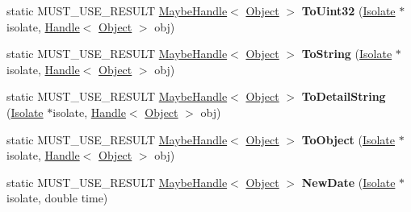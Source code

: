 \begin{DoxyCompactItemize}
\item 
\hypertarget{classv8_1_1internal_1_1_v8___f_i_n_a_l_af66ddd64eed4526cf7ae9a31807fa8ab}{}static M\+U\+S\+T\+\_\+\+U\+S\+E\+\_\+\+R\+E\+S\+U\+L\+T \hyperlink{classv8_1_1internal_1_1_maybe_handle}{Maybe\+Handle}$<$ \hyperlink{classv8_1_1internal_1_1_object}{Object} $>$ {\bfseries To\+Uint32} (\hyperlink{classv8_1_1internal_1_1_isolate}{Isolate} $\ast$isolate, \hyperlink{classv8_1_1internal_1_1_handle}{Handle}$<$ \hyperlink{classv8_1_1internal_1_1_object}{Object} $>$ obj)\label{classv8_1_1internal_1_1_v8___f_i_n_a_l_af66ddd64eed4526cf7ae9a31807fa8ab}

\item 
\hypertarget{classv8_1_1internal_1_1_v8___f_i_n_a_l_a0b9f324870c79d961237e2b643e220cc}{}static M\+U\+S\+T\+\_\+\+U\+S\+E\+\_\+\+R\+E\+S\+U\+L\+T \hyperlink{classv8_1_1internal_1_1_maybe_handle}{Maybe\+Handle}$<$ \hyperlink{classv8_1_1internal_1_1_object}{Object} $>$ {\bfseries To\+String} (\hyperlink{classv8_1_1internal_1_1_isolate}{Isolate} $\ast$isolate, \hyperlink{classv8_1_1internal_1_1_handle}{Handle}$<$ \hyperlink{classv8_1_1internal_1_1_object}{Object} $>$ obj)\label{classv8_1_1internal_1_1_v8___f_i_n_a_l_a0b9f324870c79d961237e2b643e220cc}

\item 
\hypertarget{classv8_1_1internal_1_1_v8___f_i_n_a_l_a3c789336bcb47c86cef42888e6d2f934}{}static M\+U\+S\+T\+\_\+\+U\+S\+E\+\_\+\+R\+E\+S\+U\+L\+T \hyperlink{classv8_1_1internal_1_1_maybe_handle}{Maybe\+Handle}$<$ \hyperlink{classv8_1_1internal_1_1_object}{Object} $>$ {\bfseries To\+Detail\+String} (\hyperlink{classv8_1_1internal_1_1_isolate}{Isolate} $\ast$isolate, \hyperlink{classv8_1_1internal_1_1_handle}{Handle}$<$ \hyperlink{classv8_1_1internal_1_1_object}{Object} $>$ obj)\label{classv8_1_1internal_1_1_v8___f_i_n_a_l_a3c789336bcb47c86cef42888e6d2f934}

\item 
\hypertarget{classv8_1_1internal_1_1_v8___f_i_n_a_l_a9596bc40e2fe635b7e53366e9b0d7094}{}static M\+U\+S\+T\+\_\+\+U\+S\+E\+\_\+\+R\+E\+S\+U\+L\+T \hyperlink{classv8_1_1internal_1_1_maybe_handle}{Maybe\+Handle}$<$ \hyperlink{classv8_1_1internal_1_1_object}{Object} $>$ {\bfseries To\+Object} (\hyperlink{classv8_1_1internal_1_1_isolate}{Isolate} $\ast$isolate, \hyperlink{classv8_1_1internal_1_1_handle}{Handle}$<$ \hyperlink{classv8_1_1internal_1_1_object}{Object} $>$ obj)\label{classv8_1_1internal_1_1_v8___f_i_n_a_l_a9596bc40e2fe635b7e53366e9b0d7094}

\item 
\hypertarget{classv8_1_1internal_1_1_v8___f_i_n_a_l_a9f8100aa128ddc2dfe16363ed5ead9d7}{}static M\+U\+S\+T\+\_\+\+U\+S\+E\+\_\+\+R\+E\+S\+U\+L\+T \hyperlink{classv8_1_1internal_1_1_maybe_handle}{Maybe\+Handle}$<$ \hyperlink{classv8_1_1internal_1_1_object}{Object} $>$ {\bfseries New\+Date} (\hyperlink{classv8_1_1internal_1_1_isolate}{Isolate} $\ast$isolate, double time)\label{classv8_1_1internal_1_1_v8___f_i_n_a_l_a9f8100aa128ddc2dfe16363ed5ead9d7}


\end{DoxyCompactItemize}
